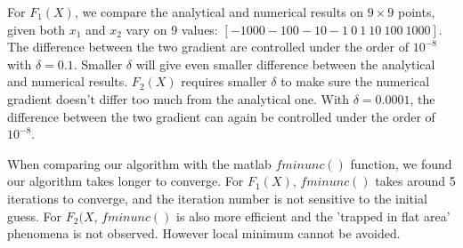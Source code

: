 For $F_1(X)$, we compare the analytical and numerical results on $9 \times 9$ points, given both $x_1$  and $x_2$ vary on 9 values: $[-1000 -100 -10 -1\  0\  1\  10\  100\   1000]$. The difference between the two gradient are controlled under the order of $10^{-8}$ with $\delta = 0.1$. Smaller $\delta$ will give even smaller difference between the analytical and numerical results. $F_2(X)$ requires smaller $\delta$ to make sure the numerical gradient doesn't differ too much from the analytical one. With $\delta = 0.0001$, the difference between the two gradient can again be controlled under the order of $10^{-8}$.

When comparing our algorithm with the matlab $fminunc()$ function, we found our algorithm takes longer to converge. For $F_1(X)$, $fminunc()$ takes around 5 iterations to converge, and the iteration number is not sensitive to the initial guess. For $F_2(X$,  $fminunc()$ is also more efficient and the 'trapped in flat area' phenomena is not observed. However local minimum cannot be avoided.

























